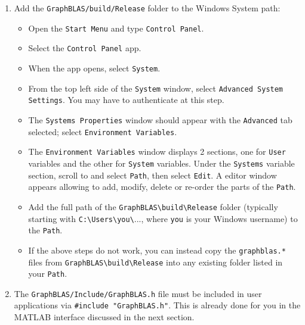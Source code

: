 \documentclass[12pt]{article}
\begin{document}
\begin{enumerate}

\item Add the \verb'GraphBLAS/build/Release' folder to the Windows System path:

    \begin{itemize}
    \item Open the \verb'Start Menu' and type \verb'Control Panel'.
    \item Select the \verb'Control Panel' app.
    \item When the app opens, select \verb'System'.
    \item From the top left side of the \verb'System' window, select
        \verb'Advanced System Settings'.  You may have to authenticate
        at this step.
    \item The \verb'Systems Properties' window should appear with the
        \verb'Advanced' tab selected;
        select \verb'Environment Variables'.
    \item The \verb'Environment Variables' window displays 2 sections, one for
        \verb'User' variables and the other for \verb'System' variables.  Under
        the \verb'Systems' variable section, scroll to and select \verb'Path',
        then select \verb'Edit'.   A editor window appears allowing to add,
        modify, delete or re-order the parts of the \verb'Path'.
    \item Add the full path of the \verb'GraphBLAS\build\Release' folder
        (typically starting with \verb'C:\Users\you\'..., where \verb'you' is
        your Windows username) to the \verb'Path'.
    \item If the above steps do not work, you can instead copy the
        \verb'graphblas.*' files from \verb'GraphBLAS\build\Release' into any
        existing folder listed in your \verb'Path'. 
    \end{itemize}

\item The \verb'GraphBLAS/Include/GraphBLAS.h' file must be included in user
    applications via \verb'#include "GraphBLAS.h"'.  This is already done for
    you in the MATLAB interface discussed in the next section.

\end{enumerate}
\end{document}
